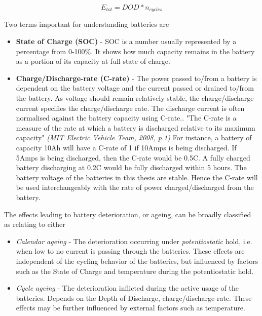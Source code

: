 \begin{equation}
    E_{tot} = DOD * n_{cycles}
    \label{eq:battery_lifetime}
\end{equation}

Two terms important for understanding batteries are
\begin{itemize}
    \item \textbf{State of Charge (SOC)}    -   SOC is a number usually represented by a percentage from 0-100\%. It shows how much capacity remains in the battery as a portion of its capacity at full state of charge.
    \item \textbf{Charge/Discharge-rate (C-rate)}    -   The power passed to/from a battery is dependent on the battery voltage and the current passed or drained to/from the battery. As voltage should remain relatively stable, the charge/discharge current specifies the charge/discharge rate. The discharge current is often normalised against the battery capacity using C-rate.\cite{MIT_Electric_Vehicle_Team2008-vm}. "The C-rate is a measure of the rate at which a  battery is discharged relative to its maximum capacity" \textit{(MIT Electric Vehicle Team, 2008, p.1)}\cite{MIT_Electric_Vehicle_Team2008-vm}  For instance, a battery of capacity 10Ah will have a C-rate of 1 if 10Amps is being discharged. If 5Amps is being discharged, then the C-rate would be 0.5C. A fully charged battery discharging at 0.2C would be fully discharged within 5 hours. The battery voltage of the batteries in this thesis are stable. Hence the C-rate will be used interchangeably with the rate of power charged/discharged from the battery.
\end{itemize}



The effects leading to  battery deterioration, or ageing, can be broadly classified as relating to either 
\begin{itemize}
    \item \textit{Calendar ageing}  -   The deterioration occurring under \textit{potentiostatic} hold, i.e. when low to no current is passing through the batteries. These effects are independent of the cycling behavior of the batteries, but influenced by factors such as the State of Charge and temperature during the potentiostatic hold. 
    \item \textit{Cycle ageing}  -   The deterioration inflicted during the active usage of the batteries. Depends on the Depth of Discharge, charge/discharge-rate. These effects may be further influenced by external factors such as temperature. 
\end{itemize}

